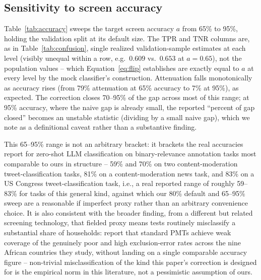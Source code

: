 \documentclass[12pt]{article}
\begin{document}
\subsection{Sensitivity to screen accuracy}

Table~\ref{tab:accuracy} sweeps the target screen accuracy $a$ from 65\% to 95\%, holding the validation split at its default size. The TPR and TNR columns are, as in Table~\ref{tab:confusion}, single realized validation-sample estimates at each level (visibly unequal within a row, e.g.\ $0.609$ vs.\ $0.653$ at $a=0.65$), not the population values -- which Equation~\ref{eq:flip} establishes are exactly equal to $a$ at every level by the mock classifier's construction. Attenuation falls monotonically as accuracy rises (from 79\% attenuation at 65\% accuracy to 7\% at 95\%), as expected. The correction closes 70--95\% of the gap across most of this range; at 95\% accuracy, where the naive gap is already small, the reported ``percent of gap closed'' becomes an unstable statistic (dividing by a small naive gap), which we note as a definitional caveat rather than a substantive finding.

This 65--95\% range is not an arbitrary bracket: it brackets the real accuracies \citet{gilardi2023chatgpt} report for zero-shot LLM classification on binary-relevance annotation tasks most comparable to ours in structure -- 59\% and 70\% on two content-moderation tweet-classification tasks, 81\% on a content-moderation news task, and 83\% on a US Congress tweet-classification task, i.e., a real reported range of roughly 59--83\% for tasks of this general kind, against which our 80\% default and 65--95\% sweep are a reasonable if imperfect proxy rather than an arbitrary convenience choice. It is also consistent with the broader finding, from a different but related screening technology, that fielded proxy means tests routinely misclassify a substantial share of households: \citet{brown2018poor} report that standard PMTs achieve weak coverage of the genuinely poor and high exclusion-error rates across the nine African countries they study, without landing on a single comparable accuracy figure -- non-trivial misclassification of the kind this paper's correction is designed for is the empirical norm in this literature, not a pessimistic assumption of ours.
\end{document}
